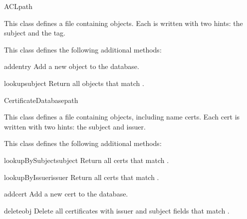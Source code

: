 \documentclass{howto}
\begin{document}
\begin{classdesc}{ACL}{path}

This class defines a file containing 
objects.  Each  is written with two hints: the subject
and the tag.

This class defines the following additional methods:

\begin{methoddesc}{add}{entry}
Add a new  object to the database.
\end{methoddesc}

\begin{methoddesc}{lookup}{subject}
Return all  objects that match .
\end{methoddesc}

\end{classdesc}

\begin{classdesc}{CertificateDatabase}{path}

This class defines a file containing 
objects, including name certs.  Each cert is written with two hints:
the subject and issuer.

This class defines the following additional methods:

\begin{methoddesc}{lookupBySubject}{subject}
Return all certs that match .
\end{methoddesc}

\begin{methoddesc}{lookupByIssuer}{issuer}
Return all certs that match .
\end{methoddesc}

\begin{methoddesc}{add}{cert}
Add a new cert  to the database.
\end{methoddesc}

\begin{methoddesc}{delete}{obj}
Delete all certificates with issuer and subject fields that match
. 
\end{methoddesc}

\end{classdesc}
\end{document}
